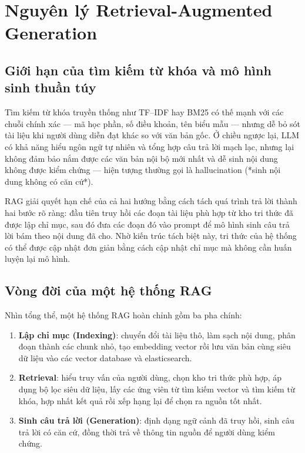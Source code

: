 \documentclass[../DoAn.tex]{subfiles}
\begin{document}
\section{Nguyên lý Retrieval-Augmented Generation}

\subsection{Giới hạn của tìm kiếm từ khóa và mô hình sinh thuần túy}

Tìm kiếm từ khóa truyền thống như TF--IDF hay BM25 có thế mạnh với các chuỗi
chính xác --- mã học phần, số điều khoản, tên biểu mẫu --- nhưng dễ bỏ sót tài
liệu khi người dùng diễn đạt khác so với văn bản gốc. Ở chiều ngược lại, LLM
có khả năng hiểu ngôn ngữ tự nhiên và tổng hợp câu trả lời mạch lạc, nhưng lại
không đảm bảo nắm được các văn bản nội bộ mới nhất và dễ sinh nội dung không
được kiểm chứng --- hiện tượng thường gọi là hallucination (*sinh nội dung
không có căn cứ*).

RAG giải quyết hạn chế của cả hai hướng bằng cách tách quá trình trả lời thành
hai bước rõ ràng: đầu tiên truy hồi các đoạn tài liệu phù hợp từ kho tri thức
đã được lập chỉ mục, sau đó đưa các đoạn đó vào prompt để mô hình sinh câu trả
lời bám theo nội dung đã cho. Nhờ kiến trúc tách biệt này, tri thức của hệ
thống có thể được cập nhật đơn giản bằng cách cập nhật chỉ mục mà không cần
huấn luyện lại mô hình.

\subsection{Vòng đời của một hệ thống RAG}

Nhìn tổng thể, một hệ thống RAG hoàn chỉnh gồm ba pha chính:

\begin{enumerate}
    \item \textbf{Lập chỉ mục (Indexing)}: chuyển đổi tài liệu thô, làm sạch
    nội dung, phân đoạn thành các chunk nhỏ, tạo embedding vector rồi lưu văn
    bản cùng siêu dữ liệu vào các vector database và elasticsearch.
    \item \textbf{Retrieval}: hiểu truy vấn của người dùng, chọn kho tri thức
    phù hợp, áp dụng bộ lọc siêu dữ liệu, lấy các ứng viên từ tìm kiếm vector
    và tìm kiếm từ khóa, hợp nhất kết quả rồi xếp hạng lại để chọn ra nguồn
    tốt nhất.
    \item \textbf{Sinh câu trả lời (Generation)}: định dạng ngữ cảnh đã truy
    hồi, sinh câu trả lời có căn cứ, đồng thời trả về thông tin nguồn để người
    dùng kiểm chứng.
\end{enumerate}
\end{document}
